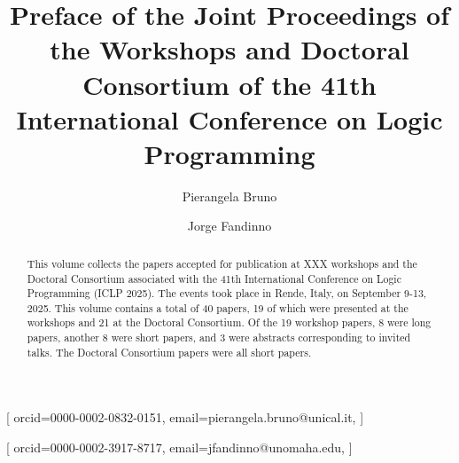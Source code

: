 \documentclass[
]{ceurart}
\begin{document}


\title{Preface of the Joint Proceedings of the Workshops and Doctoral Consortium of the 41th International Conference on Logic Programming}


\author[1]{Pierangela Bruno}[%
orcid=0000-0002-0832-0151,
email=pierangela.bruno@unical.it,
]
\address[2]{University of Calabria, Italy}


\author[2]{Jorge Fandinno}[%
orcid=0000-0002-3917-8717,
email=jfandinno@unomaha.edu,
]
\address[2]{University of Nebraska Omaha, USA}

\def\changemargin#1#2{\list{}{\rightmargin#2\leftmargin#1}\item[]}
\let\endchangemargin=\endlist 

\newcommand{\workshopp}[2]{\section{#1}\vspace{-8pt}\begin{changemargin}{19pt}{8pt} 
\rm\normalsize\it #2\end{changemargin}}
\newcommand{\workshop}[3]{\workshopp{#2}{#1 #2 (#3)}}


\begin{abstract}
This volume collects the papers accepted for publication at XXX workshops and the Doctoral Consortium associated with the 41th International Conference on Logic Programming (ICLP 2025).
%
The events took place in Rende, Italy, on September 9-13, 2025.
%
This volume contains a total of 40 papers, 19 of which were presented at the workshops and 21 at the Doctoral Consortium.
%
Of the 19 workshop papers, 8 were long papers, another 8 were short papers, and 3 were abstracts corresponding to invited talks.
%
The Doctoral Consortium papers were all short papers.
\end{abstract}
\end{document}
